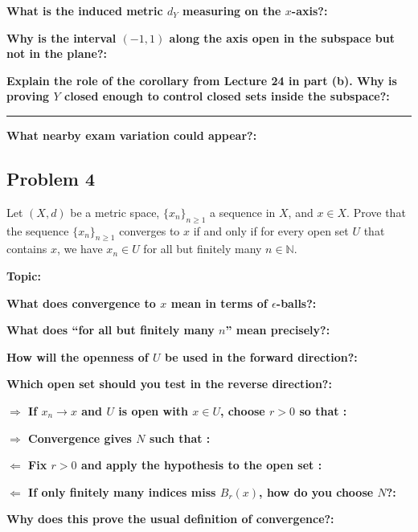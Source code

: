 \documentclass[12pt]{article}
\newcommand{\fillfield}[1]{%
  \par\noindent\textbf{#1:}\enspace\hrulefill\par\vspace{3pt}%
}
\newcommand{\fillfieldlong}[1]{%
  \par\noindent\textbf{#1:}\par\vspace{1.5cm}%
  \noindent\rule{\linewidth}{0.35pt}\par\vspace{4pt}%
}
\begin{document}
\begin{tcolorbox}[
  enhanced, breakable,
  colback  = reflectcyan,
  colframe = cyan!55!black,
  fonttitle = \bfseries,
  title = {\textsc{Reflection \& Variation}}
]
\fillfield{What is the induced metric $d_Y$ measuring on the $x$-axis?}
\fillfield{Why is the interval $(-1,1)$ along the axis open in the subspace but not in the plane?}
\fillfieldlong{Explain the role of the corollary from Lecture 24 in part (b). Why is proving $Y$ closed enough to control closed sets inside the subspace?}
\fillfield{What nearby exam variation could appear?}
\end{tcolorbox}

\newpage
\subsection{Problem 4}

\begin{tcolorbox}[
  enhanced, breakable,
  colback  = probblue,
  colframe = blue!55!black,
  fonttitle = \bfseries,
  title = {\textsc{Problem Statement}\hfill Homework 9, Problem 4}
]
Let $(X, d)$ be a metric space, $\{x_n\}_{n\ge1}$ a sequence in $X$, and $x \in X$. Prove that
the sequence $\{x_n\}_{n\ge1}$ converges to $x$ if and only if for every open set $U$ that contains
$x$, we have $x_n \in U$ for all but finitely many $n \in \mathbb{N}$.
\end{tcolorbox}

\bigskip

\begin{tcolorbox}[
  enhanced, breakable,
  colback  = pass1green,
  colframe = green!55!black,
  fonttitle = \bfseries,
  title = {Pass 1 \enspace\textbf{--}\enspace First Diagnosis}
]
\fillfield{Topic}
\fillfield{What does convergence to $x$ mean in terms of $\epsilon$-balls?}
\fillfield{What does ``for all but finitely many $n$'' mean precisely?}
\fillfield{How will the openness of $U$ be used in the forward direction?}
\fillfield{Which open set should you test in the reverse direction?}
\end{tcolorbox}

\bigskip

\begin{tcolorbox}[
  enhanced, breakable,
  colback  = pass2yellow,
  colframe = yellow!65!black,
  fonttitle = \bfseries,
  title = {Pass 2 \enspace\textbf{--}\enspace Proof Recipe Card}
]
\fillfield{$\Longrightarrow$ If $x_n\to x$ and $U$ is open with $x\in U$, choose $r>0$ so that \dotfill}
\fillfield{$\Longrightarrow$ Convergence gives $N$ such that \dotfill}
\fillfield{$\Longleftarrow$ Fix $r>0$ and apply the hypothesis to the open set \dotfill}
\fillfield{$\Longleftarrow$ If only finitely many indices miss $B_r(x)$, how do you choose $N$?}
\fillfield{Why does this prove the usual definition of convergence?}
\end{tcolorbox}
\end{document}
